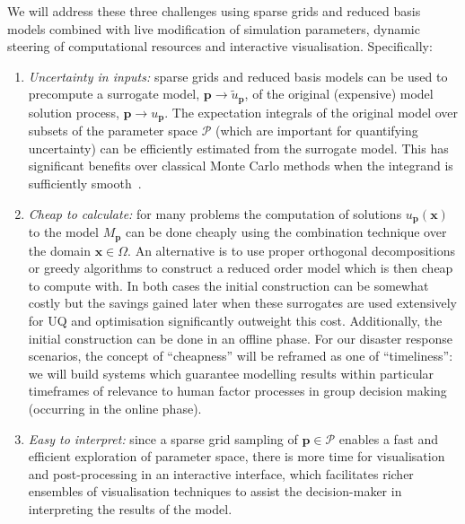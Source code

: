 \documentclass[a4paper,fontsize=12pt]{scrartcl}
\begin{document}
We will address these three challenges using sparse grids and reduced
basis models combined with live modification of simulation parameters,
dynamic steering of computational resources and interactive
visualisation. Specifically:
\begin{enumerate}
\item \emph{Uncertainty in inputs:} sparse grids and reduced basis models can be used
  to precompute a surrogate model, $\mathbf{p} \rightarrow \tilde{u}_{\mathbf{p}}$, of the original
  (expensive) model solution process, $\mathbf{p} \rightarrow {u}_{\mathbf{p}}$.
  The expectation integrals of the original model over subsets of the
  parameter space $\mathcal{P}$ (which are important for quantifying
  uncertainty) can be efficiently estimated from the
  surrogate model. This has
  significant benefits over classical Monte Carlo methods when the
  integrand is sufficiently
  smooth~\parencite{JakemanRoberts2013,FranzelinDiehlPfluger2014}.

\item \emph{Cheap to calculate:} for many problems the computation
  of solutions $u_{\mathbf{p}}(\mathbf{x})$ to the model
  $M_{\mathbf{p}}$ can be done cheaply using the combination technique
  over the domain $\mathbf{x}\in\Omega$. An alternative is to use
  proper orthogonal decompositions or greedy algorithms to construct a
  reduced order model which is then cheap to compute with. In both
  cases the initial construction can be somewhat costly but the
  savings gained later when these surrogates are used extensively for
  UQ and optimisation significantly outweight this cost. Additionally,
  the initial construction can be done in an offline phase. For our
  disaster response scenarios, the concept of ``cheapness'' will be
  reframed as one of ``timeliness'': we will build systems which
  guarantee modelling results within particular timeframes of
  relevance to human factor processes in group decision making
  (occurring in the online phase).

\item \emph{Easy to interpret:} since a sparse grid sampling of
  $\mathbf{p}\in\mathcal{P}$ enables a fast and efficient exploration
  of parameter space, there is more time for visualisation and
  post-processing in an interactive interface, which facilitates
  richer ensembles of visualisation techniques to assist the
  decision-maker in interpreting the results of the model.
\end{enumerate}

\end{document}
